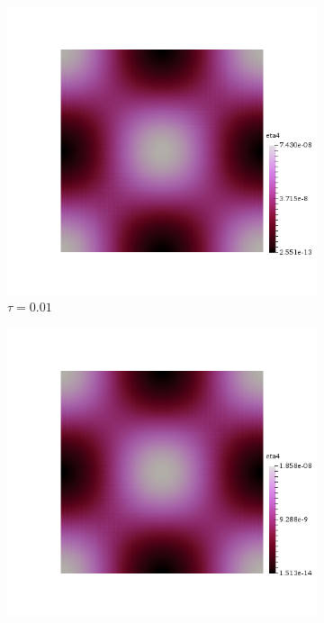 \begin{figure}[h!]
  \centering
  \begin{subfigure}[b]{0.24\textwidth}
    \includegraphics[width=\textwidth,height=\textheight,keepaspectratio,height=\textheight,keepaspectratio]{figures/1_mpet/time/eta4_dt1.png}
    \caption{$\tau=0.01$}
  \end{subfigure}
  \begin{subfigure}[b]{0.24\textwidth}
    \includegraphics[width=\textwidth,height=\textheight,keepaspectratio,height=\textheight,keepaspectratio]{figures/1_mpet/time/eta4_dt2.png}

\end{subfigure}
\end{figure}
